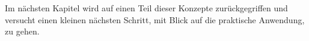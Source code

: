 Im nächsten Kapitel wird auf einen Teil dieser Konzepte zurückgegriffen und versucht einen kleinen nächsten Schritt, mit Blick auf die praktische Anwendung, zu gehen.

